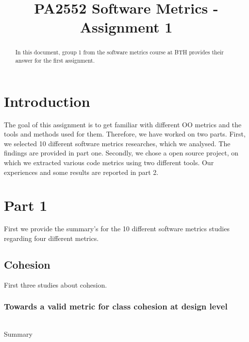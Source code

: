 \documentclass[conference]{IEEEtran}
\begin{document}
\title{PA2552 Software Metrics - Assignment 1}

\author{
    \and
    \and
    \and
}

\maketitle

\begin{abstract}
In this document, group 1 from the software metrics course at BTH provides their answer for the first assignment.
\end{abstract}


\section{Introduction}
The goal of this assignment is to get familiar with different OO metrics and the tools and methods used for them. Therefore, we have worked on two parts. First, we selected 10 different software metrics researches, which we analysed. The findings are provided in part one. Secondly, we chose a open source project, on which we extracted various code metrics using two different tools. Our experiences and some results are reported in part 2.


\section{Part 1}
First we provide the summary's for the 10 different software metrics studies regarding four different metrics.

\subsection{Cohesion}
First three studies about cohesion.\\

\subsubsection{Towards a valid metric for class cohesion at design level}\cite{s118_cohision}\\
Summary
\end{document}
